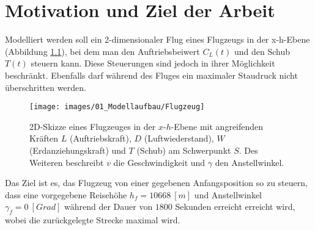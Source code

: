 \chapter{Motivation und Ziel der Arbeit}
Modelliert werden soll ein 2-dimensionaler Flug eines Flugzeugs in der x-h-Ebene (Abbildung \ref{img:Flugzeug}), bei dem man den Auftriebsbeiwert $C_L(t)$ und den Schub $T(t)$ steuern kann. Diese Steuerungen sind jedoch in ihrer Möglichkeit beschränkt. Ebenfalls darf während des Fluges ein maximaler Staudruck nicht überschritten werden.

\begin{figure}[H]
\begin{center}
\texttt{[image: images/01\_Modellaufbau/Flugzeug]}
\caption{2D-Skizze eines Flugzeuges in der $x$-$h$-Ebene mit angreifenden Kräften $L$ (Auftriebskraft), $D$ (Luftwiederstand), $W$ (Erdanziehungskraft) und $T$ (Schub) am Schwerpunkt $S$. Des Weiteren beschreibt $v$ die Geschwindigkeit und $\gamma$ den Anstellwinkel.}\label{img:Flugzeug}
\end{center}
\end{figure}

Das Ziel ist es, das Flugzeug von einer gegebenen Anfangsposition so zu steuern, dass eine vorgegebene Reisehöhe $h_f = 10668 \ [m]$ und Anstellwinkel $\gamma_f = 0 \ [Grad]$ während der Dauer von $1800$ Sekunden erreicht erreicht wird, wobei die zurückgelegte Strecke maximal wird.
